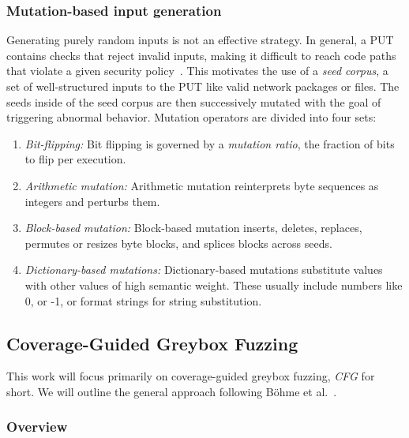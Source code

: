 \subsubsection{Mutation-based input generation}

Generating purely random inputs is not an effective strategy.
In general, a PUT contains checks that reject invalid inputs, making it
difficult to reach code paths that violate a given security policy~\cite{manes_art_2019}.
This motivates the use of a \emph{seed corpus}, a set of well-structured inputs
to the PUT like valid network packages or files.
The seeds inside of the seed corpus are then successively mutated with the goal
of triggering abnormal behavior.
Mutation operators are divided into four sets:

\begin{enumerate}
  \item \emph{Bit-flipping:}
    Bit flipping is governed by a \emph{mutation ratio}, the fraction of bits to
    flip per execution.

  \item \emph{Arithmetic mutation:}
    Arithmetic mutation reinterprets byte sequences as integers and perturbs them.

  \item \emph{Block-based mutation:}
    Block-based mutation inserts, deletes, replaces, permutes or resizes byte blocks,
    and splices blocks across seeds.

  \item \emph{Dictionary-based mutations:}
    Dictionary-based mutations substitute values with other values of high semantic
    weight. These usually include numbers like 0, or -1, or format strings for
    string substitution.
\end{enumerate}

\subsection{Coverage-Guided Greybox Fuzzing}\label{sec:fuzzing-cgf}

This work will focus primarily on coverage-guided greybox fuzzing, \emph{CFG} for short.
We will outline the general approach following Böhme et al.~\cite{TODO cite boehme17}.

\subsubsection{Overview}


